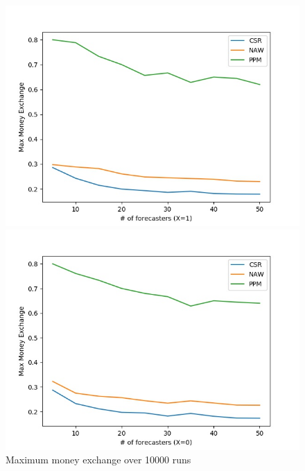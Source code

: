 \documentclass[english,10pt]{article}
\begin{document}
\begin{enumerate}
        	\begin{figure}[H]
        	\centering
        	\begin{minipage}{0.48\textwidth}
        \includegraphics[width = \textwidth]{(uniform)Max_MnEx(X=1).jpg}
        	\end{minipage}
        	\begin{minipage}{0.48\textwidth}
        	\includegraphics[width = \textwidth]{(uniform)Max_MnEx(X=0).jpg}
        	\end{minipage}
        	\caption{Maximum money exchange over 10000 runs}
        	\end{figure}
        	

\end{enumerate}
\end{document}
